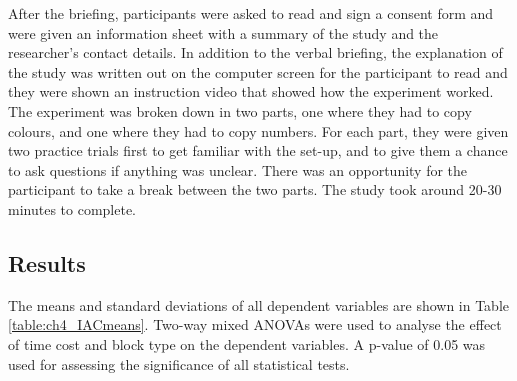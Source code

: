 After the briefing, participants were asked to read and sign a consent form and were given an information sheet with a summary of the study and the researcher's contact details. In addition to the verbal briefing, the explanation of the study was written out on the computer screen for the participant to read and they were shown an instruction video that showed how the experiment worked. 
The experiment was broken down in two parts, one where they had to copy colours, and one where they had to copy numbers. For each part, they were given two practice trials first to get familiar with the set-up, and to give them a chance to ask questions if anything was unclear. There was an opportunity for the participant to take a break between the two parts. The study took around 20-30 minutes to complete.

\subsection{Results}
The means and standard deviations of all dependent variables are shown in Table \ref{table:ch4_IACmeans}. Two-way mixed ANOVAs were used to analyse the effect of time cost and block type on the dependent variables. A p-value of 0.05 was used for assessing the significance of all statistical tests. 


